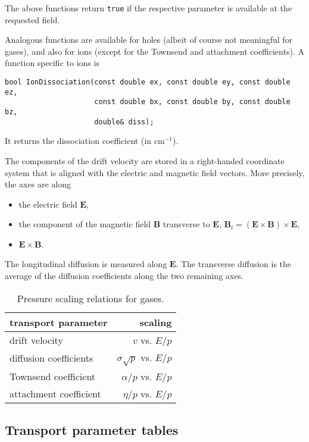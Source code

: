 The above functions return \texttt{true} if the respective parameter 
is available at the requested field.  

Analogous functions are available for holes 
(albeit of course not meaningful for gases), and also for ions 
(except for the Townsend and attachment coefficients). 
A function specific to ions is
\begin{lstlisting}
bool IonDissociation(const double ex, const double ey, const double ez,
                     const double bx, const double by, const double bz,
                     double& diss);
\end{lstlisting}
It returns the dissociation coefficient (in cm\(^{-1}\)). 

The components of the drift velocity are stored in a right-handed 
coordinate system that is aligned with the electric and magnetic field vectors.
More precisely, the axes are along
\begin{itemize}
  \item
  the electric field \(\mathbf{E}\),
  \item
  the component of the magnetic field \(\mathbf{B}\) transverse to 
  \(\mathbf{E}\), 
  \(\mathbf{B}_{t} = \left(\mathbf{E} \times \mathbf{B}\right) \times \textbf{E}\),
  \item
  \(\mathbf{E} \times \mathbf{B}\).
\end{itemize}
The longitudinal diffusion is measured along \(\mathbf{E}\).
The transverse diffusion is the average of the diffusion coefficients 
along the two remaining axes.

\begin{table}
  \centering
  \begin{tabular}{l r}
    \toprule
    transport parameter & scaling \\
    \midrule
    drift velocity & \(v\) vs. \(E/p\) \\
    diffusion coefficients & \(\sigma\sqrt{p}\) vs. \(E/p\) \\
    Townsend coefficient & \(\alpha / p\) vs. \(E/p\) \\
    attachment coefficient & \(\eta / p\) vs. \(E/p\) \\ 
    \bottomrule
  \end{tabular}
  \caption{Pressure scaling relations for gases.}
  \label{Tab:PressureScaling}
\end{table}

\subsection{Transport parameter tables}

